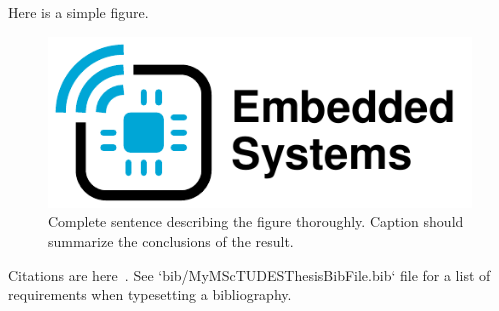 Here is a simple figure.

\begin{figure}[t]
\includegraphics[width=\textwidth]{template-pics/tud-es-logo-tikz/tud-es-logo}
\caption{Complete sentence describing the figure thoroughly. Caption should summarize the conclusions of the result.}
\label{fig:example-figure}
\end{figure}

Citations are here~\cite{polastre2004analysis,powercast_website,hester2016persistent,schaper_msc_thesis_2017,dementyev_uist_2016}. See `bib/MyMScTUDESThesisBibFile.bib` file for a list of requirements when typesetting a bibliography.
